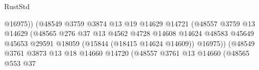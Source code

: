 \begin{lexlean}{RustStd}
\begin{coremodule}
                                                        @16975))
                                                    (@48549
                                                      @3759
                                                      @3874
                                                      @13
                                                      @19
                                                      @14629
                                                      @14721
                                                      (@48557
                                                        @3759
                                                        @13
                                                        @14629
                                                        (@48565
                                                          @276
                                                          @37
                                                          @13
                                                          @4562
                                                          @4728
                                                          @14608
                                                          @14624
                                                          @48583
                                                          @45649
                                                          @45653
                                                          @29591
                                                          @18059
                                                          (@15844 (@18415 @14624 @14609))
                                                          @16975))
                                                      (@48549
                                                        @3761
                                                        @3873
                                                        @13
                                                        @18
                                                        @14660
                                                        @14720
                                                        (@48557
                                                          @3761
                                                          @13
                                                          @14660
                                                          (@48565
                                                            @553
                                                            @37

\end{coremodule}
\end{lexlean}
